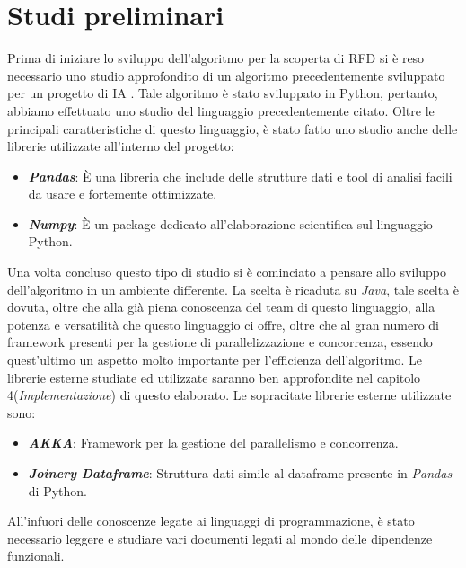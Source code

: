 \section{Studi preliminari}
Prima di iniziare lo sviluppo dell'algoritmo per la scoperta di RFD si è reso necessario uno studio approfondito di un algoritmo precedentemente sviluppato per un progetto di IA \cite{tesinaIA}.
Tale algoritmo è stato sviluppato in Python, pertanto, abbiamo effettuato uno studio del linguaggio precedentemente citato.
Oltre le principali caratteristiche di questo linguaggio, è stato fatto uno studio anche delle librerie utilizzate all'interno del progetto:
\begin{itemize}
	\item \textbf{\emph{Pandas}}: È una libreria che include delle strutture dati e tool di analisi facili da usare e fortemente ottimizzate. 
	\item \textbf{\emph{Numpy}}: È un package dedicato all'elaborazione scientifica sul linguaggio Python.
\end{itemize}
Una volta concluso questo tipo di studio si è cominciato a pensare allo sviluppo dell'algoritmo in un ambiente differente.
La scelta è ricaduta su \emph{Java}, tale scelta è dovuta, oltre che alla già piena conoscenza del team di questo linguaggio, alla potenza e versatilità che questo linguaggio ci offre, oltre che al gran numero di framework presenti per la gestione di parallelizzazione e concorrenza, essendo quest'ultimo un aspetto molto importante per l'efficienza dell'algoritmo.
Le librerie esterne studiate ed utilizzate saranno ben approfondite nel capitolo 4(\emph{Implementazione}) di questo elaborato.
Le sopracitate librerie esterne utilizzate sono:
\begin{itemize}
	\item \textbf{\emph{AKKA}}: Framework per la gestione del parallelismo e concorrenza.
	\item \textbf{\emph{Joinery Dataframe}}: Struttura dati simile al dataframe presente in \emph{Pandas} di Python.
\end{itemize}
All'infuori delle conoscenze legate ai linguaggi di programmazione, è stato necessario leggere e studiare vari documenti legati al mondo delle dipendenze funzionali.